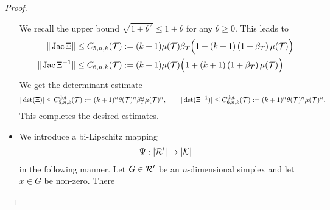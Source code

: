 \documentclass[10pt,letterpaper]{article}
\begin{document}
\begin{proof}
\begin{itemize}
        We recall the upper bound $\sqrt{1+\theta^2} \leq 1 + \theta$ for any $\theta \geq 0$. 
        This leads to  
        \begin{align*}
            \| \operatorname{{\rm Jac}} \Xi \|
            &\leq 
            C_{5,n,k}({\mathcal T})
            :=
            (k+1) 
            \mu({\mathcal T})
            \beta_T
            \Big( 
                1 
                + 
                (k+1) 
                \left( 1 + \beta_T \right)
                \mu({\mathcal T})
            \Big)            
            \\
            \| \operatorname{{\rm Jac}} \Xi^{-1} \|
            &\leq  
            C_{6,n,k}({\mathcal T})
            :=
            (k+1) 
            \mu({\mathcal T})
            \Big( 
                1 
                + 
                (k+1) 
                \left( 1 + \beta_T \right)
                \mu({\mathcal T})
            \Big)            
        \end{align*}
        We get the determinant estimate 
        \begin{align*}
            |\det(\Xi)|
            \leq 
            C^{\det}_{5,n,k}({\mathcal T})
            :=
            (k+1)^{n}
            \theta({\mathcal T})^{n}
            \beta_T^{n}
            \mu({\mathcal T})^{n}
            ,
            \qquad 
            |\det(\Xi^{-1})|
            \leq 
            C^{\det}_{6,n,k}({\mathcal T})
            :=
            (k+1)^{n}
            \theta({\mathcal T})^{n}
            \mu({\mathcal T})^{n}
            .
        \end{align*}
        This completes the desired estimates. 
        
        
        
        
        
        
        
        
        \item 
        We introduce a bi-Lipschitz mapping 
        \begin{align*}
            \Psi : |{\mathcal R}'| \rightarrow |{\mathcal K}|
        \end{align*}
        in the following manner. Let ${G} \in {\mathcal R}'$ be an $n$-dimensional simplex and let $x \in {G}$ be non-zero. There 


\end{itemize}
\end{proof}
\end{document}
